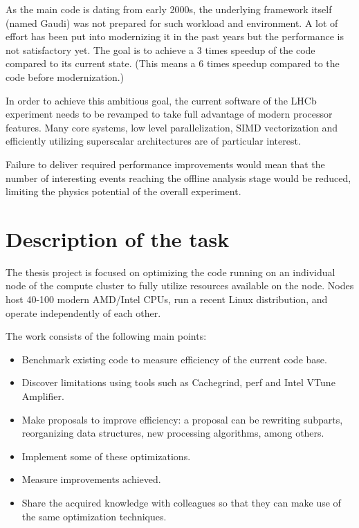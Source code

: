 \documentclass[12pt]{article}
\begin{document}
	\vspace{0.7pc}	
	As the main code is dating from early 2000s, the underlying framework itself (named Gaudi) was not prepared for such workload and environment. A lot of effort has been put into modernizing it in the past years but the performance is not satisfactory yet. The goal is to achieve a 3 times speedup of the code compared to its current state. (This means a 6 times speedup compared to the code before modernization.)
	
	\vspace{0.7pc}
	In order to achieve this ambitious goal, the current software of the LHCb experiment needs to be revamped to take full advantage of modern processor features. Many core systems, low level parallelization, SIMD vectorization and efficiently utilizing superscalar architectures are of particular interest.	
	
	\vspace{0.7pc}
	Failure to deliver required performance improvements would mean that the number of interesting events reaching the offline analysis stage would be reduced, limiting the physics potential of the overall experiment.	
	
	
	\newpage
	\section{Description of the task}
	
	\color{blue}
	The thesis project is focused on optimizing the code running on an individual node of the compute cluster to fully utilize resources available on the node. Nodes host 40-100 modern AMD/Intel CPUs, run a recent Linux distribution, and operate independently of each other.
	\color{black}
	
	\vspace{1pc}
	The work consists of the following main points:
	
	\begin{itemize}
		\item Benchmark existing code to measure efficiency of the current code base.
		\item Discover limitations using tools such as Cachegrind, perf and Intel VTune Amplifier.
		\item Make proposals to improve efficiency: a proposal can be rewriting subparts, reorganizing data structures, new processing algorithms, among others.
		\item Implement some of these optimizations.
		\item Measure improvements achieved.
		\item Share the acquired knowledge with colleagues so that they can make use of the same optimization techniques.
	\end{itemize}	
		
\end{document}
